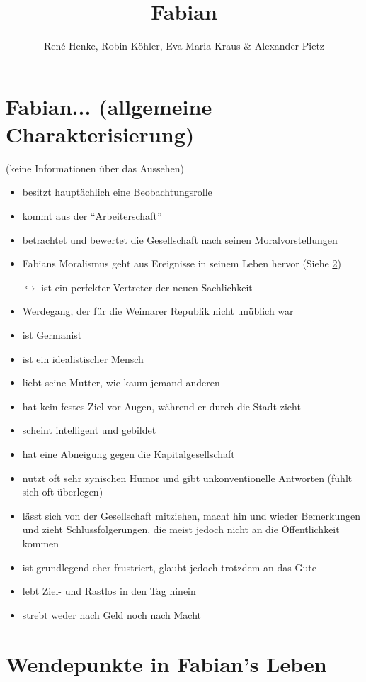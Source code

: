\documentclass[a4paper,9pt]{article}
\title{Fabian}
\author{René Henke, Robin Köhler, Eva-Maria Kraus \& Alexander Pietz}
\begin{document}
\maketitle

\section{Fabian... (allgemeine Charakterisierung)}
(keine Informationen über das Aussehen)
\begin{itemize}
 \item besitzt hauptächlich eine Beobachtungsrolle
 \item kommt aus der ``Arbeiterschaft''
 \item betrachtet und bewertet die Gesellschaft nach seinen Moralvorstellungen
 \item Fabians Moralismus geht aus Ereignisse in seinem Leben hervor (Siehe \ref{wp})
 \item[$\hookrightarrow$] ist ein perfekter Vertreter der neuen Sachlichkeit
 \item Werdegang, der für die Weimarer Republik nicht unüblich war
 \item ist Germanist
 \item ist ein idealistischer Mensch
 \item liebt seine Mutter, wie kaum jemand anderen
 \item hat kein festes Ziel vor Augen, während er durch die Stadt zieht
 \item scheint intelligent und gebildet
 \item hat eine Abneigung gegen die Kapitalgesellschaft 
 \item nutzt oft sehr zynischen Humor und gibt unkonventionelle Antworten (fühlt sich oft überlegen)
 \item lässt sich von der Gesellschaft mitziehen, macht hin und wieder Bemerkungen und zieht Schlussfolgerungen, die meist jedoch nicht an die Öffentlichkeit kommen
 \item ist grundlegend eher frustriert, glaubt jedoch trotzdem an das Gute
 \item lebt Ziel- und Rastlos in den Tag hinein
 \item strebt weder nach Geld noch nach Macht
 \end{itemize}

\section{Wendepunkte in Fabian's Leben}\label{wp}
\end{document}
